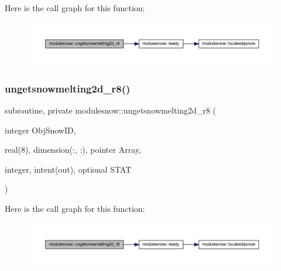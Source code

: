 Here is the call graph for this function\+:\nopagebreak
\begin{figure}[H]
\begin{center}
\leavevmode
\includegraphics[width=350pt]{namespacemodulesnow_ad46c82bdf9dd0bdd57a7edce05221094_cgraph}
\end{center}
\end{figure}
\mbox{\label{namespacemodulesnow_a042504d2eebab701131d198c2c1146d5}} 
\subsubsection{\texorpdfstring{ungetsnowmelting2d\+\_\+r8()}{ungetsnowmelting2d\_r8()}}
{\footnotesize\ttfamily subroutine, private modulesnow\+::ungetsnowmelting2d\+\_\+r8 (\begin{DoxyParamCaption}\item[{integer}]{Obj\+Snow\+ID,  }\item[{real(8), dimension(\+:, \+:), pointer}]{Array,  }\item[{integer, intent(out), optional}]{S\+T\+AT }\end{DoxyParamCaption})\hspace{0.3cm}{\ttfamily [private]}}

Here is the call graph for this function\+:\nopagebreak
\begin{figure}[H]
\begin{center}
\leavevmode
\includegraphics[width=350pt]{namespacemodulesnow_a042504d2eebab701131d198c2c1146d5_cgraph}
\end{center}
\end{figure}
\mbox{\label{namespacemodulesnow_a4a825586dc688763fa3df8c6402fe6c3}} 
